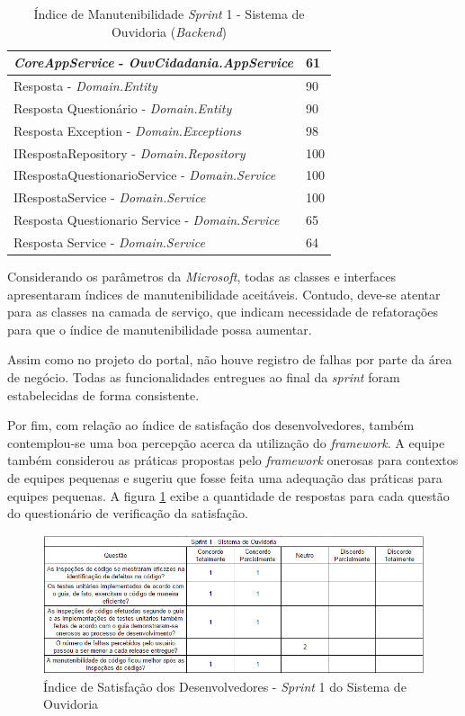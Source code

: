 \begin{table}[h]
\caption{Índice de Manutenibilidade \textit{Sprint} 1 - Sistema de Ouvidoria (\textit{Backend})}
\centering
\begin{tabular}{ | m{12cm} | m{4cm} | } 
\hline
\textit{CoreAppService} - \textit{OuvCidadania.AppService} & 61 \\ 
\hline
Resposta - \textit{Domain.Entity} & 90 \\ 
\hline
Resposta Questionário - \textit{Domain.Entity} & 90 \\ 
\hline
Resposta Exception - \textit{Domain.Exceptions} & 98 \\ 
\hline
IRespostaRepository - \textit{Domain.Repository} & 100 \\
\hline
IRespostaQuestionarioService - \textit{Domain.Service} & 100 \\
\hline
IRespostaService - \textit{Domain.Service} & 100 \\
\hline
Resposta Questionario Service - \textit{Domain.Service} & 65 \\
\hline
Resposta Service - \textit{Domain.Service} & 64 \\
\hline
\end{tabular}
\label{table:tabela6}
\end{table}

\hfill \break

Considerando os parâmetros da \textit{Microsoft}, todas as classes e interfaces apresentaram índices de manutenibilidade aceitáveis. Contudo, deve-se atentar para as classes na camada de serviço, que indicam necessidade de refatorações para que o índice de manutenibilidade possa aumentar.

Assim como no projeto do portal, não houve registro de falhas por parte da área de negócio. Todas as funcionalidades entregues ao final da \textit{sprint} foram estabelecidas de forma consistente.

Por fim, com relação ao índice de satisfação dos desenvolvedores, também contemplou-se uma boa percepção acerca da utilização do \textit{framework}. A equipe também considerou as práticas propostas pelo \textit{framework} onerosas para contextos de equipes pequenas e sugeriu que fosse feita uma adequação das práticas para equipes pequenas. A figura \ref{fig:satisfacaoOuvidoria1} exibe a quantidade de respostas para cada questão do questionário de verificação da satisfação.

\begin{figure}[h]
\includegraphics[width=\textwidth]{figuras/isd_ouvdf_1.png}
\caption{Índice de Satisfação dos Desenvolvedores - \textit{Sprint} 1 do Sistema de Ouvidoria}
\label{fig:satisfacaoOuvidoria1}
\end{figure}

